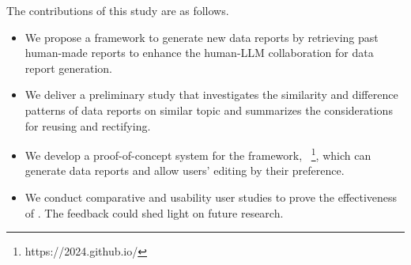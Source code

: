 The contributions of this study are as follows. 
\begin{itemize}
    \item We propose a framework to generate new data reports by retrieving past human-made reports to enhance the human-LLM collaboration for data report generation. 
    \item We deliver a preliminary study that investigates the similarity and difference patterns of data reports on similar topic and summarizes the considerations for reusing and rectifying. 
    \item We develop a proof-of-concept system for the framework, \system{}~\footnote{https://\system{}2024.github.io/}, which can generate data reports and allow users' editing by their preference. 
    \item We conduct comparative and usability user studies to prove the effectiveness of \system{}. The feedback could shed light on future research.
\end{itemize}